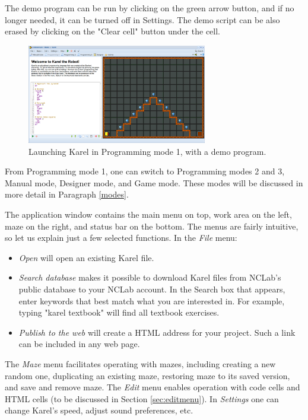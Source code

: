 The demo program can be run by clicking on the green arrow button, and 
if no longer needed, it can be turned off in Settings. The demo script 
can be also erased by clicking on the "Clear cell" button under the cell.

\newpage

\begin{figure}[!ht]
\begin{center}
\includegraphics[width=0.7\textwidth]{img/init.png}
\end{center}
\vspace{-2mm}
\caption{Launching Karel in Programming mode 1, with a demo program.}
\label{fig:init}
\end{figure}

\noindent
From Programming mode 1, one can switch to Programming modes 2 and 3,
Manual mode, Designer mode, and Game mode. These modes will be discussed 
in more detail in Paragraph \ref{modes}.

The application window contains the main menu on top,
work area on the left, maze on the right, and status bar on the bottom.
The menus are fairly intuitive, so let us explain just a few selected 
functions. In the {\em File} menu:

\begin{itemize}
\item {\em Open} will open an existing Karel file.
\item {\em Search database} makes it possible to download Karel files from NCLab's
      public database to your NCLab account. In the Search box that appears, enter 
      keywords that best match what you are interested in. For example, typing 
      "karel textbook" will find all textbook exercises.  
\item {\em Publish to the web} will create a HTML address for your project. Such 
      a link can be included in any web page. 
\end{itemize}
The {\em Maze} menu facilitates operating with mazes, including creating a new random 
one, duplicating an existing maze, restoring maze to its saved version, and save and remove 
maze. The {\em Edit} menu enables operation with code cells and HTML cells (to be discussed in 
Section \ref{sec:editmenu}). In {\em Settings} one can change Karel's speed, adjust sound 
preferences, etc.

